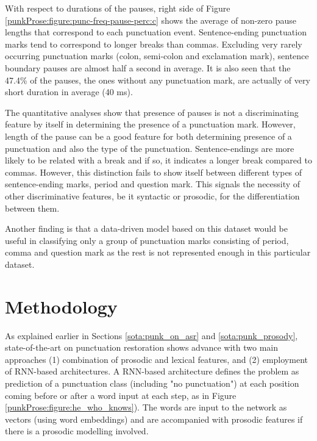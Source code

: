 With respect to durations of the pauses, right side of Figure \ref{punkProse:figure:punc-freq-pause-perc:c} shows the average of non-zero pause lengths that correspond to each punctuation event. Sentence-ending punctuation marks tend to correspond to longer breaks than commas. Excluding very rarely occurring punctuation marks (colon, semi-colon and exclamation mark), sentence boundary pauses are almost half a second in average. It is also seen that the 47.4\% of the pauses, the ones without any punctuation mark, are actually of very short duration in average (40 ms).

The quantitative analyses show that presence of pauses is not a discriminating feature by itself in determining the presence of a punctuation mark. However, length of the pause can be a good feature for both determining presence of a punctuation and also the type of the punctuation. Sentence-endings are more likely to be related with a break and if so, it indicates a longer break compared to commas. However, this distinction fails to show itself between different types of sentence-ending marks, period and question mark. This signals the necessity of other discriminative features, be it syntactic or prosodic, for the differentiation between them.

Another finding is that a data-driven model based on this dataset would be useful in classifying only a group of punctuation marks consisting of period, comma and question mark as the rest is not represented enough in this particular dataset. 


\section{Methodology}
\label{punkProse:methodology}

As explained earlier in Sections \ref{sota:punk_on_asr} and \ref{sota:punk_prosody}, state-of-the-art on punctuation restoration shows advance with two main approaches (1) combination of prosodic and lexical features, and (2) employment of RNN-based architectures. A RNN-based architecture defines the problem as prediction of a punctuation class (including "no punctuation") at each position coming before or after a word input at each step, as in Figure \ref{punkProse:figure:he_who_knows}). The words are input to the network as vectors (using word embeddings) and are accompanied with prosodic features if there is a prosodic modelling involved.

